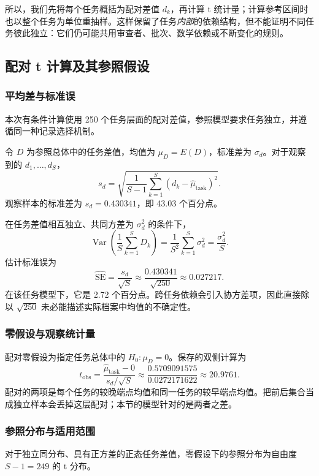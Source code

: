 所以，我们先将每个任务概括为配对差值 $d_k$，再计算 t 统计量；计算参考区间时也以整个任务为单位重抽样。这样保留了任务\emph{内部}的依赖结构，但不能证明不同任务彼此独立：它们仍可能共用审查者、批次、数学依赖或不断变化的规则。

\subsection{配对 t 计算及其参照假设}
\label{subsec:paired-t-explanation}
\subsubsection{平均差与标准误}
本次有条件计算使用 250 个任务层面的配对差值，参照模型要求任务独立，并遵循同一种记录选择机制。

令 $D$ 为参照总体中的任务差值，均值为 $\mu_D=E(D)$，标准差为 $\sigma_d$。对于观察到的 $d_1,\ldots,d_S$，
\[
s_d=\sqrt{\frac{1}{S-1}\sum_{k=1}^{S}(d_k-\widehat\mu_{\mathrm{task}})^2}.
\]
观察样本的标准差为 $s_d=0.430341$，即 43.03 个百分点。

在任务差值相互独立、共同方差为 $\sigma_d^2$ 的条件下，
\[
\operatorname{Var}\!\left(\frac{1}{S}\sum_{k=1}^{S}D_k\right)
=\frac{1}{S^2}\sum_{k=1}^{S}\sigma_d^2
=\frac{\sigma_d^2}{S}.
\]
估计标准误为
\[
\widehat{\mathrm{SE}}=\frac{s_d}{\sqrt S}
\approx\frac{0.430341}{\sqrt{250}}\approx0.027217.
\]
在该任务模型下，它是 2.72 个百分点。跨任务依赖会引入协方差项，因此直接除以 $\sqrt{250}$ 未必能描述实际档案中均值的不确定性。

\subsubsection{零假设与观察统计量}
配对零假设为指定任务总体中的 $H_0:\mu_D=0$。保存的双侧计算为\cite{nistpaired,scipyttest}
\begin{equation}
t_{\mathrm{obs}}=\frac{\widehat\mu_{\mathrm{task}}-0}{s_d/\sqrt S}
\approx\frac{0.5709091575}{0.0272171622}\approx20.9761.
\label{eq:paired-t-worked}
\end{equation}
配对的两项是每个任务的较晚端点均值和同一任务的较早端点均值。把前后集合当成独立样本会丢掉这层配对；本节的模型针对的是两者之差。

\subsubsection{参照分布与适用范围}
对于独立同分布、具有正方差的正态任务差值，零假设下的参照分布为自由度 $S-1=249$ 的 t 分布。

